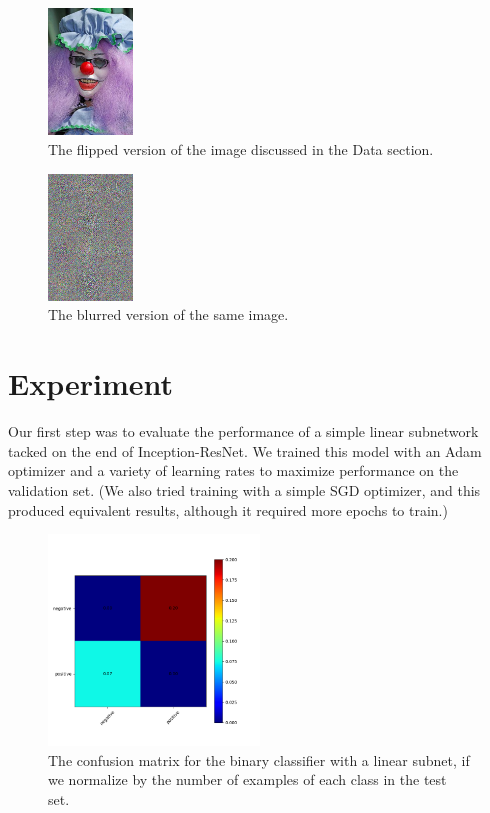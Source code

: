 \documentclass[10pt,twocolumn,letterpaper]{article}
\begin{document}
\begin{figure}
\centering
\includegraphics[width=0.2\textwidth]{FLIPPED_fear-394.png}
\caption{The flipped version of the image discussed in the Data section.}
\end{figure}

\begin{figure}
\centering
\includegraphics[width=0.2\textwidth]{BLURRED_fear-394.png}
\caption{The blurred version of the same image.}
\end{figure}

\section{Experiment}

Our first step was to evaluate the performance of a simple linear subnetwork tacked on the end of Inception-ResNet. We trained this model with an Adam optimizer and a variety of learning rates to maximize performance on the validation set. (We also tried training with a simple SGD optimizer, and this produced equivalent results, although it required more epochs to train.)

\begin{figure}
\centering
\includegraphics[width=0.5\textwidth]{normalized_confusion_matrix_2_classes_no_hidden.png}
\caption{The confusion matrix for the binary classifier with a linear subnet, if we normalize by the number of examples of each class in the test set.}
\end{figure}
\end{document}
